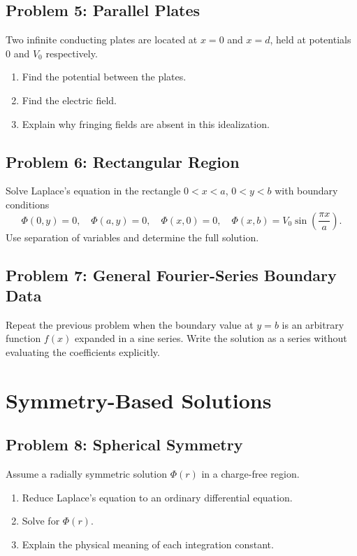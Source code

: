 \documentclass[hidelinks]{article}
\begin{document}
\subsection{Problem 5: Parallel Plates}
Two infinite conducting plates are located at $x=0$ and $x=d$, held at potentials $0$ and $V_0$ respectively.
\begin{enumerate}[label=\alph*)]
\item Find the potential between the plates.
\item Find the electric field.
\item Explain why fringing fields are absent in this idealization.
\end{enumerate}

\subsection{Problem 6: Rectangular Region}
Solve Laplace's equation in the rectangle $0<x<a$, $0<y<b$ with boundary conditions
\[
\Phi(0,y)=0,\quad \Phi(a,y)=0,\quad \Phi(x,0)=0,\quad \Phi(x,b)=V_0\sin\left(\frac{\pi x}{a}\right).
\]
Use separation of variables and determine the full solution.

\subsection{Problem 7: General Fourier-Series Boundary Data}
Repeat the previous problem when the boundary value at $y=b$ is an arbitrary function $f(x)$ expanded in a sine series. Write the solution as a series without evaluating the coefficients explicitly.

\section{Symmetry-Based Solutions}
\subsection{Problem 8: Spherical Symmetry}
Assume a radially symmetric solution $\Phi(r)$ in a charge-free region.
\begin{enumerate}[label=\alph*)]
\item Reduce Laplace's equation to an ordinary differential equation.
\item Solve for $\Phi(r)$.
\item Explain the physical meaning of each integration constant.
\end{enumerate}
\end{document}
